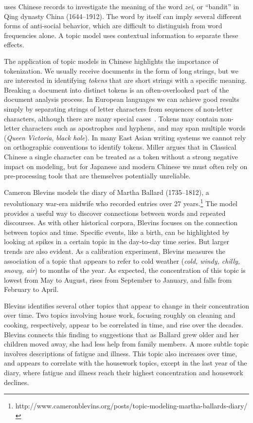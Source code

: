 \citet{miller-13} uses Chinese records to investigate the meaning of
the word {\em zei}, or ``bandit'' in Qing dynasty China (1644--1912). The word by
itself can imply several different forms of anti-social behavior,
which are difficult to distinguish from word frequencies alone. A
topic model uses contextual information to separate these effects.

The application of topic models in Chinese highlights the importance of tokenization.
We usually receive documents in the form of long strings, but we are interested in identifying {\em tokens} that are short strings with a specific meaning.
Breaking a document into distinct tokens is an often-overlooked part of the document analysis process.
In European languages we can achieve good results simply by separating strings of letter characters from sequences of non-letter characters, although there are many special cases~\citep{Boyd-Graber-14}.
Tokens may contain non-letter characters such as apostrophes and hyphens, and may span multiple words ({\em Queen Victoria}, {\em black hole}).
In many East Asian writing systems we cannot rely on orthographic conventions to identify tokens.
Miller argues that in Classical Chinese a single character can be treated as a token without a strong negative impact on modeling, but for Japanese and modern Chinese we must often rely on pre-processing tools that are themselves potentially unreliable.


Cameron Blevins models the diary of Martha Ballard (1735--1812), a revolutionary war-era midwife who recorded entries over 27 years.\footnote{http://www.cameronblevins.org/posts/topic-modeling-martha-ballards-diary/} The model provides a useful way to discover connections between words and repeated discourses.
As with other historical corpora, Blevins focuses on the connection between topics and time.
Specific events, like a birth, can be highlighted by looking at spikes in a certain topic in the day-to-day time series.
But larger trends are also evident.
As a calibration experiment, Blevins measures the association of a topic that appears to refer to cold weather ({\em cold, windy, chilly, snowy, air}) to months of the year.
As expected, the concentration of this topic is lowest from May to August, rises from September to January, and falls from February to April.

Blevins identifies several other topics that appear to change in their concentration over time.
Two topics involving house work, focusing roughly on cleaning and cooking, respectively, appear to be correlated in time, and rise over the decades.
Blevins connects this finding to suggestions that as Ballard grew older and her children moved away, she had less help from family members.
A more subtle topic involves descriptions of fatigue and illness.
This topic also increases over time, and appears to correlate with the housework topics, except in the last year of the diary, where fatigue and illness reach their highest concentration and housework declines.

